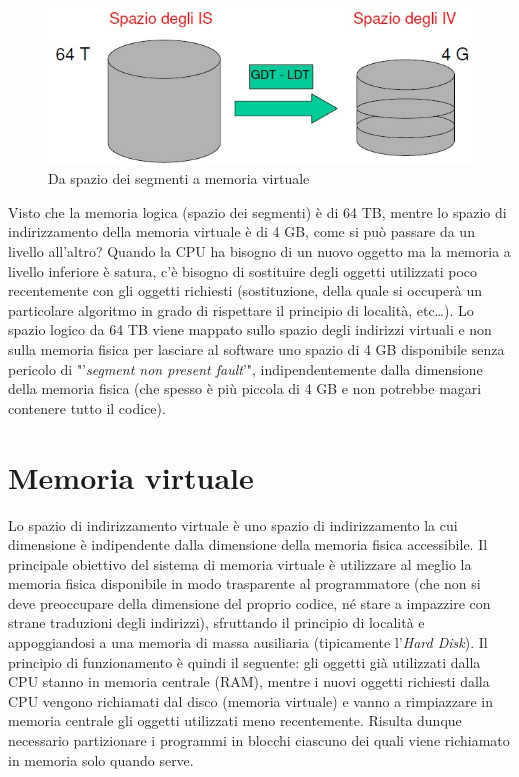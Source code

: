 \begin{figure}[!h]
\centering
\includegraphics[width=0.65\columnwidth]{img/segmentiVirtuale}
\caption{Da spazio dei segmenti a memoria virtuale}
\label{fig:segmentiVirtuale}
\end{figure}

Visto che la memoria logica (spazio dei segmenti) è di 64 TB, mentre lo spazio di indirizzamento della memoria virtuale è di 4 GB, come si può passare da un livello all'altro? Quando la CPU ha bisogno di un nuovo oggetto ma la memoria a livello inferiore è satura, c'è bisogno di sostituire degli oggetti utilizzati poco recentemente con gli oggetti richiesti (sostituzione, della quale si occuperà un particolare algoritmo in grado di rispettare il principio di località, etc\ldots). Lo spazio logico da 64 TB viene mappato sullo spazio degli indirizzi virtuali e non sulla memoria fisica per lasciare al software uno spazio di 4 GB disponibile senza pericolo di "'\textit{segment non present fault}'", indipendentemente dalla dimensione della memoria fisica (che spesso è più piccola di 4 GB e non potrebbe magari contenere tutto il codice). 

\section{Memoria virtuale}
\label{sec:memoriaVirtuale}

Lo spazio di indirizzamento virtuale è uno spazio di indirizzamento la cui dimensione è indipendente dalla dimensione della memoria fisica accessibile. Il principale obiettivo del sistema di memoria virtuale è utilizzare al
meglio la memoria fisica disponibile in modo trasparente al programmatore (che non si deve preoccupare della dimensione del proprio codice, né stare a impazzire con strane traduzioni degli indirizzi), sfruttando il principio di località e appoggiandosi a una memoria di massa ausiliaria (tipicamente l'\textit{Hard Disk}). Il principio di funzionamento è quindi il seguente: gli oggetti già utilizzati dalla CPU stanno in memoria centrale (RAM), mentre i nuovi oggetti richiesti dalla CPU vengono richiamati dal disco (memoria virtuale) e vanno a rimpiazzare in memoria centrale gli oggetti utilizzati meno recentemente. Risulta dunque necessario partizionare i programmi in blocchi ciascuno dei quali viene richiamato in memoria solo quando serve.

